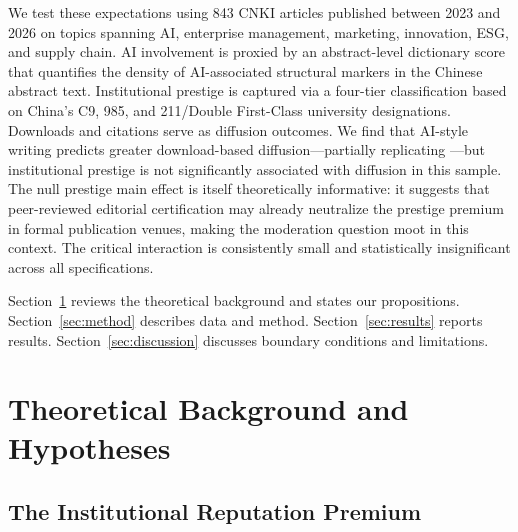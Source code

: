 \documentclass[12pt,a4paper]{article}
\begin{document}
We test these expectations using 843 CNKI articles published between
2023 and 2026 on topics spanning AI, enterprise management, marketing,
innovation, ESG, and supply chain.
AI involvement is proxied by an abstract-level dictionary score that
quantifies the density of AI-associated structural markers in the
Chinese abstract text.
Institutional prestige is captured via a four-tier classification
based on China's C9, 985, and 211/Double First-Class university
designations.
Downloads and citations serve as diffusion outcomes.
We find that AI-style writing predicts greater download-based
diffusion---partially replicating \citet{JoLi2026}---but institutional
prestige is not significantly associated with diffusion in this sample.
The null prestige main effect is itself theoretically informative:
it suggests that peer-reviewed editorial certification may already
neutralize the prestige premium in formal publication venues, making
the moderation question moot in this context.
The critical interaction is consistently small and statistically
insignificant across all specifications.

Section~\ref{sec:theory} reviews the theoretical background and states
our propositions.
Section~\ref{sec:method} describes data and method.
Section~\ref{sec:results} reports results.
Section~\ref{sec:discussion} discusses boundary conditions and limitations.

\section{Theoretical Background and Hypotheses}
\label{sec:theory}

\subsection{The Institutional Reputation Premium}
\end{document}
